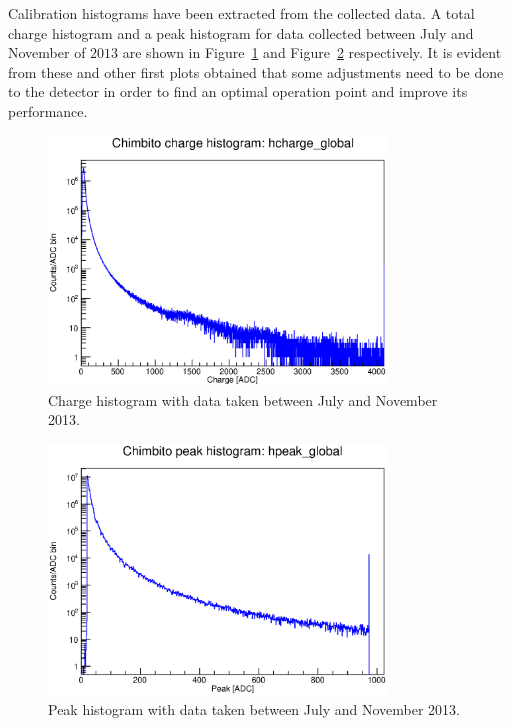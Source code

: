 \documentclass[12pt]{article}
\begin{document}
Calibration histograms have been extracted from the collected data. A total charge histogram and a peak histogram for data collected between July and November of $2013$ are shown in Figure~\ref{fig:charge} and Figure~\ref{fig:peak} respectively. It is evident from these and other first plots obtained that some adjustments need to be done to the detector in order to find an optimal operation point and improve its performance. 

 \begin{figure}[!ht]
  \centering
 \includegraphics[width=0.8\textwidth]{charge_histo_chimbito_jul_nov_2013.eps}
  \caption{Charge histogram with data taken between July and November 2013.}
  \label{fig:charge}
 \end{figure}
 
  \begin{figure}[!ht]
  \centering
 \includegraphics[width=0.8\textwidth]{peak_histo_chimbito_jul_nov_2013.eps}
  \caption{Peak histogram with data taken between July and November 2013.}
  \label{fig:peak}
 \end{figure}
 
\end{document}
